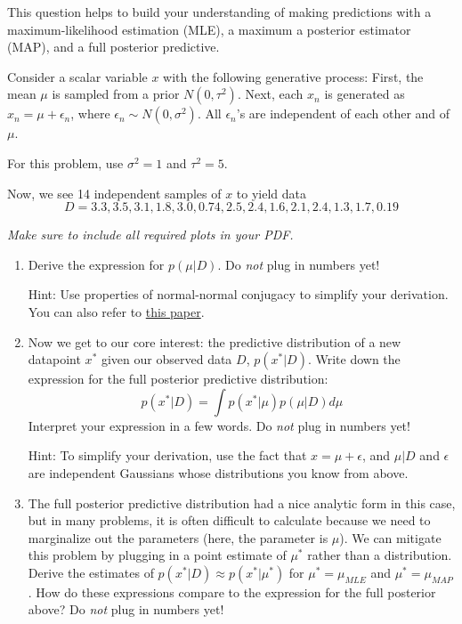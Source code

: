 \documentclass[submit]{harvardml}
\begin{document}
\begin{problem}

  This question helps to build your understanding of making
  predictions with a maximum-likelihood estimation (MLE), a maximum a
  posterior estimator (MAP), and a full posterior predictive.

  Consider a scalar variable $x$ with the following generative
  process: First, the mean $\mu$ is sampled from a prior
  $N(0,\tau^2)$.  Next, each $x_n$ is generated as $x_n = \mu +
  \epsilon_n$, where $\epsilon_n \sim N(0,\sigma^2)$. All
  $\epsilon_n$'s are independent of each other and of $\mu$.

  For this problem, use $\sigma^2 = 1$ and $\tau^2 = 5$.  

  Now, we see 14 independent samples of $x$ to yield data
  $$D = 3.3, 3.5, 3.1, 1.8, 3.0, 0.74, 2.5, 2.4, 1.6, 2.1, 2.4, 1.3, 1.7, 0.19$$
    
  \textit{Make sure to include all required plots in your PDF.}

\begin{enumerate}

\item Derive the expression for $p(\mu|D)$.  Do \emph{not} plug in
  numbers yet!

  Hint: Use properties of normal-normal conjugacy to simplify your derivation.  You can also refer to \href{https://www.cs.ubc.ca/~murphyk/Papers/bayesGauss.pdf}{this paper}.
  
\item Now we get to our core interest: the predictive distribution of
  a new datapoint $x^*$ given our observed data $D$, $p(x^*|D)$.
  Write down the expression for the full posterior predictive
  distribution: $$p(x^*|D) = \int p(x^*|\mu)p(\mu|D) d\mu$$ Interpret
  your expression in a few words.  Do \emph{not} plug in numbers yet!

  Hint: To simplify your derivation,
  use the fact that $x = \mu + \epsilon$, and $\mu|D$ and $\epsilon$
  are independent Gaussians whose distributions you know from above.
  
\item The full posterior predictive distribution had a nice analytic
  form in this case, but in many problems, it is often difficult to
  calculate because we need to marginalize out the parameters (here,
  the parameter is $\mu$). We can mitigate this problem by plugging in
  a point estimate of $\mu^*$ rather than a distribution. Derive the
  estimates of $p(x^*|D) \approx p(x^*|\mu^*)$ for $\mu^* = \mu_{MLE}$
  and $\mu^* = \mu_{MAP}$.  How do these expressions compare to the
  expression for the full posterior above? Do \emph{not} plug in
  numbers yet!
  

\end{enumerate}
\end{problem}
\end{document}
